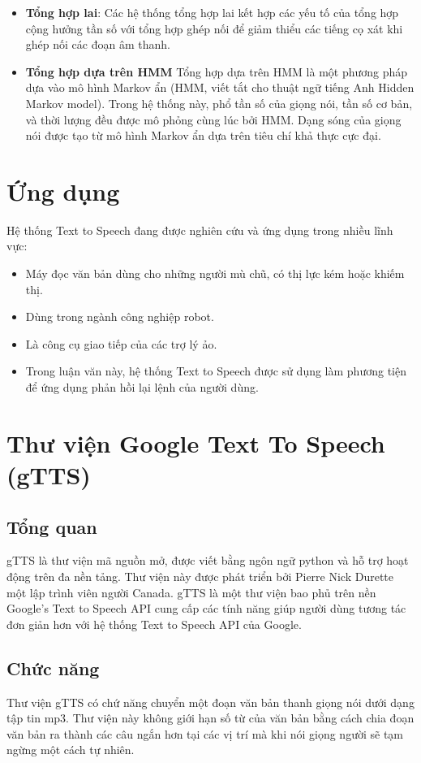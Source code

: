 \begin{itemize}
\item \textbf{Tổng hợp lai}: Các hệ thống tổng hợp lai kết hợp các yếu tố của tổng hợp cộng hưởng tần số với tổng hợp ghép nối để giảm thiểu các tiếng cọ xát khi ghép nối các đoạn âm thanh.

\item \textbf{Tổng hợp dựa trên HMM}
Tổng hợp dựa trên HMM là một phương pháp dựa vào mô hình Markov ẩn (HMM, viết tắt cho thuật ngữ tiếng Anh Hidden Markov model). Trong hệ thống này, phổ tần số của giọng nói, tần số cơ bản, và thời lượng đều được mô phỏng cùng lúc bởi HMM. Dạng sóng của giọng nói được tạo từ mô hình Markov ẩn dựa trên tiêu chí khả thực cực đại.
\end{itemize}

\section{Ứng dụng}
Hệ thống Text to Speech đang được nghiên cứu và ứng dụng trong nhiều lĩnh vực:
\begin{itemize}
	\item Máy đọc văn bản dùng cho những người mù chũ, có thị lực kém hoặc khiếm thị.
	\item Dùng trong ngành công nghiệp robot.
	\item Là công cụ giao tiếp của các trợ lý ảo.
	\item Trong luận văn này, hệ thống Text to Speech được sử dụng làm phương tiện để ứng dụng phản hồi lại lệnh của người dùng.
\end{itemize}

\section{Thư viện Google Text To Speech (gTTS)}
\subsection{Tổng quan}
gTTS là thư viện mã nguồn mở, được viết bằng ngôn ngữ python và hỗ trợ hoạt động trên đa nền tảng. Thư viện này được phát triển bởi Pierre Nick Durette một lập trình viên người Canada.
gTTS là một thư viện bao phủ trên nền Google's Text to Speech API cung cấp các tính năng giúp người dùng tương tác đơn giản hơn với hệ thống Text to Speech API của Google.

\subsection{Chức năng}
Thư viện gTTS có chứ năng chuyển một đoạn văn bản thanh giọng nói dưới dạng tập tin mp3. Thư viện này không giới hạn số từ của văn bản bằng cách chia đoạn văn bản ra thành các câu ngắn hơn tại các vị trí mà khi nói giọng người sẽ tạm ngừng một cách tự nhiên.

